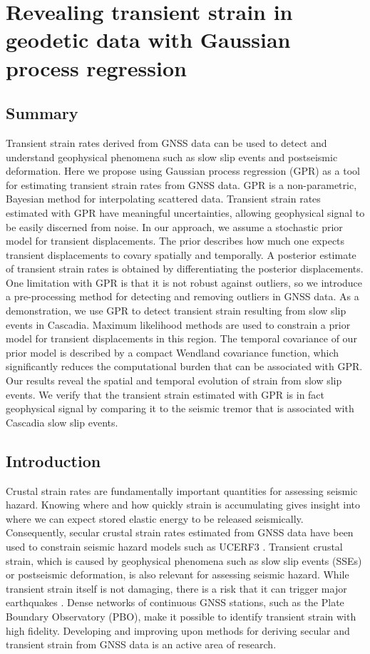 \chapter{Revealing transient strain in geodetic data with Gaussian
process regression}

\section{Summary}
Transient strain rates derived from GNSS data can be used to detect
and understand geophysical phenomena such as slow slip events and
postseismic deformation. Here we propose using Gaussian process
regression (GPR) as a tool for estimating transient strain rates from
GNSS data. GPR is a non-parametric, Bayesian method for interpolating
scattered data. Transient strain rates estimated with GPR have
meaningful uncertainties, allowing geophysical signal to be easily
discerned from noise. In our approach, we assume a stochastic prior
model for transient displacements. The prior describes how much one
expects transient displacements to covary spatially and temporally. A
posterior estimate of transient strain rates is obtained by
differentiating the posterior displacements. One limitation with GPR
is that it is not robust against outliers, so we introduce a
pre-processing method for detecting and removing outliers in GNSS
data. As a demonstration, we use GPR to detect transient strain
resulting from slow slip events in Cascadia. Maximum likelihood
methods are used to constrain a prior model for transient
displacements in this region. The temporal covariance of our prior
model is described by a compact Wendland covariance function, which
significantly reduces the computational burden that can be associated
with GPR. Our results reveal the spatial and temporal evolution of
strain from slow slip events. We verify that the transient strain
estimated with GPR is in fact geophysical signal by comparing it to
the seismic tremor that is associated with Cascadia slow slip events.

\section{Introduction}\label{ch5:sec:Introduction}
Crustal strain rates are fundamentally important quantities for
assessing seismic hazard. Knowing where and how quickly strain is
accumulating gives insight into where we can expect stored elastic
energy to be released seismically. Consequently, secular crustal
strain rates estimated from GNSS data have been used to constrain
seismic hazard models such as UCERF3 \citep{Field2014}. Transient
crustal strain, which is caused by geophysical phenomena such as slow
slip events (SSEs) or postseismic deformation, is also relevant for
assessing seismic hazard. While transient strain itself is not
damaging, there is a risk that it can trigger major earthquakes
\citep{Roeloffs2006,Freed2001}. Dense networks of continuous GNSS
stations, such as the Plate Boundary Observatory (PBO), make it
possible to identify transient strain with high fidelity. Developing
and improving upon methods for deriving secular and transient strain
from GNSS data is an active area of research.


